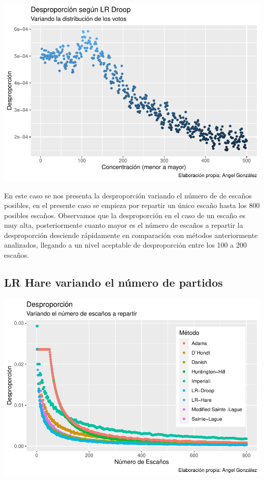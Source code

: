 \documentclass[12pt,a4paper,]{book}
\numberwithin{dummy}{section}
\theoremstyle{ocrenumbox}
\theoremstyle{blacknumex}
\theoremstyle{blacknumbox}
\theoremstyle{ocrenum}
\theoremstyle{ocrenum}
\begin{document}
\begin{center}\includegraphics[width=0.95\linewidth]{figurasR/unnamed-chunk-48-1} \end{center}

En este caso se nos presenta la desproporción variando el número de de
escaños posibles, en el presente caso se empieza por repartir un único
escaño hasta los 800 posibles escaños. Observamos que la desproporción
en el caso de un escaño es muy alta, posteriormente cuanto mayor es el
número de escaños a repartir la desproporción desciende rápidamente en
comparación con métodos anteriormente analizados, llegando a un nivel
aceptable de desproporción entre los 100 a 200 escaños.

\hypertarget{lr-hare-variando-el-nuxfamero-de-partidos}{%
\subsection{LR Hare variando el número de
partidos}\label{lr-hare-variando-el-nuxfamero-de-partidos}}

\begin{center}\includegraphics[width=0.95\linewidth]{figurasR/unnamed-chunk-49-1} \end{center}
\end{document}
